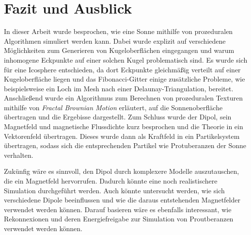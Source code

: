 \section{Fazit und Ausblick}
In dieser Arbeit wurde besprochen, wie eine Sonne mithilfe von prozeduralen
Algorithmen simuliert werden kann. Dabei wurde explizit auf verschiedene
Möglichkeiten zum Generieren von Kugeloberflächen eingegangen und warum
inhomogene Eckpunkte auf einer solchen Kugel problematisch sind. Es wurde
sich für eine Icosphere entschieden, da dort Eckpunkte gleichmäßig verteilt
auf einer Kugeloberfläche liegen und das Fibonacci-Gitter einige zusätzliche
Probleme, wie beispielsweise ein Loch im Mesh nach einer
Delaunay-Triangulation, bereitet. Anschließend wurde ein Algorithmus zum
Berechnen von prozeduralen Texturen mithilfe von \textit{Fractal Brownian
Motion} erläutert, auf die Sonnenoberfläche übertragen und die Ergebisse
dargestellt. Zum Schluss wurde der Dipol, sein Magnetfeld und magnetische
Flussdichte kurz besprochen und die Theorie in ein Vektorenfeld übertragen.
Dieses wurde dann als Kraftfeld in ein Partikelsystem übertragen, sodass sich
die entsprechenden Partikel wie Protuberanzen der Sonne verhalten.

Zukünfig wäre es sinnvoll, den Dipol durch komplexere Modelle auszutauschen,
die ein Magnetfeld hervorrufen. Dadurch könnte eine noch realistischere
Simulation durchgeführt werden. Auch könnte untersucht werden, wie sich
verschiedene Dipole beeinflussen und wie die daraus entstehenden
Magnetfelder verwendet werden können. Darauf basieren wäre es ebenfalls
interessant, wie Rekonnexionen und deren Energiefreigabe zur Simulation
von Proutberanzen verwendet werden können.